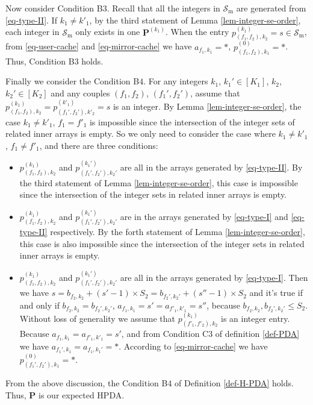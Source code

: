 \documentclass[onecolumn,10pt]{IEEEtran}
\theoremstyle{mythm}
\begin{document}
{Now  consider Condition B$3$. Recall that all the integers in $\mathcal{S}_{\text{m}}$ are generated from \eqref{eq-type-II}. If $k_1\neq k'_1$, by the third statement of Lemma \ref{lem-integer-se-order}, each integer in $\mathcal{S}_{\text{m}}$ only exists in one $\mathbf{P}^{(k_1)}$. When the entry  $p^{(k_1)}_{(f_1,f_2),k_2}=s\in \mathcal{S}_{\text{m}}$, from \eqref{eq-user-cache} and \eqref{eq-mirror-cache} we have $a_{f_1,k_1}=*$, $p^{(0)}_{(f_1,f_2),k_1}=*$. Thus, Condition B$3$ holds.

Finally we consider the Condition B$4$. For any integers $k_1$, $k_1'\in [K_1]$, $k_2$, $k_2'\in [K_2]$ and any couples $(f_1,f_2)$, $(f_1',f_2')$, assume that $p^{(k_1)}_{(f_1,f_2),k_2}=
p^{(k'_1)}_{(f_1',f_2'),k'_2}=s$ is an integer. By Lemma \ref{lem-integer-se-order}, the case $k_1\neq k'_1$, $f_1=f'_1$ is impossible since the intersection of the integer sets of related inner arrays is empty. So we only need to consider the case where $k_1\neq k'_1$, $f_1\neq f'_1$, and there are three conditions:
\begin{itemize}
\item $p^{(k_1)}_{(f_1,f_2),k_2}$ and $p^{(k_1')}_{(f_1',f_2'),k_2'}$ are all in the arrays generated by \eqref{eq-type-II}. By the third statement of Lemma \ref{lem-integer-se-order}, this case is impossible since the intersection of the integer sets in related inner arrays is empty.
\item $p^{(k_1)}_{(f_1,f_2),k_2}$ and $p^{(k_1')}_{(f_1',f_2'),k_2'}$ are in the arrays generated by \eqref{eq-type-I} and \eqref{eq-type-II} respectively. By the forth statement of Lemma \ref{lem-integer-se-order}, this case is also impossible since the intersection of the integer sets in related inner arrays is empty.
\item $p^{(k_1)}_{(f_1,f_2),k_2}$ and $p^{(k_1')}_{(f_1',f_2'),k_2'}$ are all in the arrays generated by \eqref{eq-type-I}. Then we have $s=b_{f_2,k_2}+(s'-1)\times S_2=b_{f_2',k_2'}+(s''-1)\times S_2$ and it's     true if and only if $b_{f_2,k_2}=b_{f_2',k_2'}$, $a_{f_1,k_1}=s'=a_{f'_1,k'_1}=s''$, because $b_{f_2,k_2}, b_{f_2',k_2'}\leq S_2$. Without loss of generality we assume that $p^{(k_1)}_{(f'_1,f'_2),k_2}$ is an integer entry. Because $a_{f_1,k_1}=a_{f'_1,k'_1}=s'$, and from Condition C$3$ of definition \ref{def-PDA} we have $a_{f_1',k_1}=a_{f_1,k_1'}=*$. According to \eqref{eq-mirror-cache} we have $p^{(0)}_{(f_1',f_2'),k_1}=*$.
\end{itemize}
 From the above discussion, the Condition B$4$ of Definition \ref{def-H-PDA} holds. Thus, $\mathbf{P}$ is our expected HPDA.

}
\end{document}
